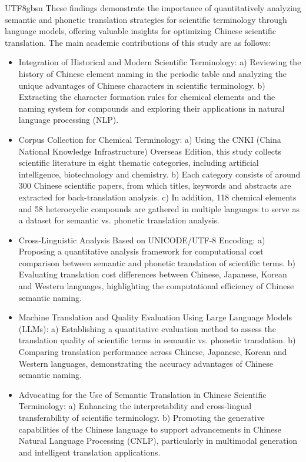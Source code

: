\documentclass[conference]{IEEEtran}
\begin{document}
\begin{CJK*}{UTF8}{gbsn}
These findings demonstrate the importance of quantitatively analyzing semantic and phonetic translation strategies for scientific terminology through language models, offering valuable insights for optimizing Chinese scientific translation. The main academic contributions of this study are as follows:

\begin{itemize}
\item Integration of Historical and Modern Scientific Terminology: a) Reviewing the history of Chinese element naming in the periodic table and analyzing the unique advantages of Chinese characters in scientific terminology. b) Extracting the character formation rules for chemical elements and the naming system for compounds and exploring their applications in natural language processing (NLP).

\item Corpus Collection for Chemical Terminology: a) Using the CNKI (China National Knowledge Infrastructure) Overseas Edition, this study collects scientific literature in eight thematic categories, including artificial intelligence, biotechnology and chemistry. b) Each category consists of around 300 Chinese scientific papers, from which titles, keywords and abstracts are extracted for back-translation analysis. c) In addition, 118 chemical elements and 58 heterocyclic compounds are gathered in multiple languages to serve as a dataset for semantic vs. phonetic translation analysis.
\item Cross-Linguistic Analysis Based on UNICODE/UTF-8 Encoding: a) Proposing a quantitative analysis framework for computational cost comparison between semantic and phonetic translation of scientific terms. b) Evaluating translation cost differences between Chinese, Japanese, Korean and Western languages, highlighting the computational efficiency of Chinese semantic naming.

\item Machine Translation and Quality Evaluation Using Large Language Models (LLMs): a) Establishing a quantitative evaluation method to assess the translation quality of scientific terms in semantic vs. phonetic translation. b) Comparing translation performance across Chinese, Japanese, Korean and Western languages, demonstrating the accuracy advantages of Chinese semantic naming.

\item Advocating for the Use of Semantic Translation in Chinese Scientific Terminology: a) Enhancing the interpretability and cross-lingual transferability of scientific terminology. b) Promoting the generative capabilities of the Chinese language to support advancements in Chinese Natural Language Processing (CNLP), particularly in multimodal generation and intelligent translation applications.
\end{itemize}


\end{CJK*}
\end{document}
